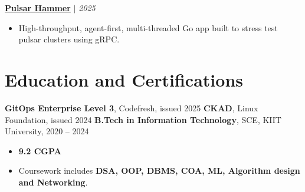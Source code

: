 \documentclass[12pt,a4paper]{article}
\newcommand{\resumeProject}[3]{%
  \vspace{2pt}
  \textbf{\href{#2}{#1}} $\mid$ \textit{#3}
}
\begin{document}
\resumeProject{Pulsar Hammer}{https://github.com/om22shree/pulsar-hammer}{2025}
\begin{itemize}
    \item High-throughput, agent-first, multi-threaded Go app built to stress test pulsar clusters using gRPC.
\end{itemize}

\section*{Education and Certifications}
\textbf{GitOps Enterprise Level 3}, Codefresh, issued 2025 \newline
\textbf{CKAD}, Linux Foundation, issued 2024 \newline
\textbf{B.Tech in Information Technology}, SCE, KIIT University, 2020 -- 2024
\begin{itemize}
    \item \textbf{9.2 CGPA}
    \item Coursework includes \textbf{DSA, OOP, DBMS, COA, ML, Algorithm design and Networking}.
\end{itemize}
\end{document}
